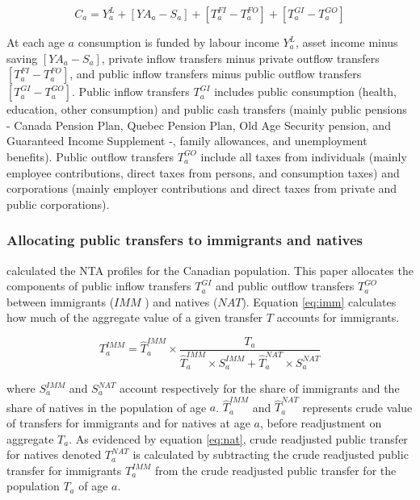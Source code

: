 \begin{equation}\label{eq:1}
  C_a = Y^L_a+[YA_a-S_a]+[T^{FI}_a-T^{FO}_a]+[T^{GI}_a-T^{GO}_a]
\end{equation}

At each age \(a\) consumption is funded by labour income \(Y^L_a\), asset income minus saving \([YA_a-S_a]\), private inflow transfers minus private outflow transfers \([T^{FI}_a-T^{FO}_a]\), and public inflow transfers minus public outflow transfers \([T^{GI}_a-T^{GO}_a]\).
Public inflow transfers \(T^{GI}_a\) includes public consumption (health, education, other consumption) and public cash transfers (mainly public pensions - Canada Pension Plan, Quebec Pension Plan, Old Age Security pension, and Guaranteed Income Supplement -, family allowances, and unemployment benefits).
Public outflow transfers  \(T^{GO}_a\) include all taxes from individuals (mainly employee contributions, direct taxes from persons, and consumption taxes) and corporations (mainly employer contributions and direct taxes from private and public corporations).

\subsubsection*{Allocating public transfers to immigrants and natives}
\citet{Merette:2019kz} calculated the NTA profiles for the Canadian population.
This paper allocates the components of public inflow transfers \(T^{GI}_a\) and public outflow transfers \(T^{GO}_a\) between immigrants (\(IMM\) ) and natives (\(NAT\)).
Equation \eqref{eq:imm} calculates how much of the aggregate value of a given transfer \(T\) accounts for immigrants.

\begin{equation}\label{eq:imm}
 {T}^{IMM}_a = \hat{T}^{IMM}_a \times \frac{{T}_a}{\hat{T}^{IMM}_a \times S^{IMM}_a + \hat{T}^{NAT}_a \times S^{NAT}_a}
\end{equation}

where \( S^{IMM}_a \) and \( S^{NAT}_a \) account respectively for the share of immigrants and the share of natives in the population of age \(a\). \(\hat{T}^{IMM}_a \) and \( \hat{T}^{NAT}_a\) represents crude value of transfers for immigrants and for natives at age \(a\), before readjustment on aggregate \({T}_a \).
As evidenced by equation \eqref{eq:nat}, crude readjusted public transfer for natives denoted \({T}^{NAT}_a \)  is calculated by subtracting the crude readjusted public transfer for immigrants \({T}^{IMM}_a \) from the crude readjusted public transfer for the population \({T}_a \) of age \(a\).

